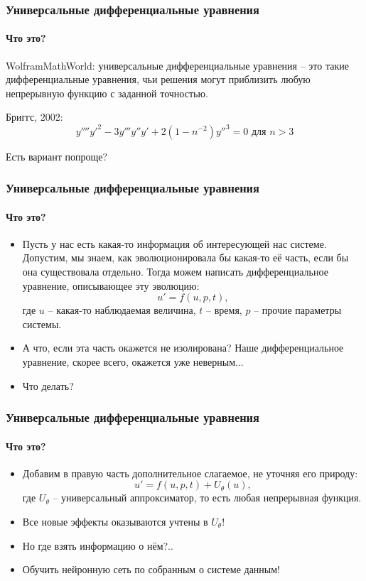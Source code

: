 \documentclass[10pt,pdf,hyperref={unicode}]{beamer}
\begin{document}
		\begin{frame}
			\frametitle{Универсальные дифференциальные уравнения} 
			\framesubtitle{Что это?}
				\begin{center}
				 	WolframMathWorld: универсальные дифференциальные уравнения -- это такие дифференциальные уравнения, чьи решения могут приблизить любую непрерывную функцию с заданной точностью. 
				 	\begin{block}{Бриггс, 2002:}
				 		\begin{displaymath}
				 		y''''y'^2 - 3y'''y''y'+2(1-n^{-2})y''^3=0 \text{ для  } n > 3
				 		\end{displaymath}
				 	\end{block}
			 		\hfill\break
			 		\hfill\break
			 		\hfill\break
				 	 \pause
					Есть вариант попроще?
				 \end{center}
		\end{frame}
	
		\begin{frame}
			\frametitle{Универсальные дифференциальные уравнения} 
			\framesubtitle{Что это?}
			\begin{center}
				\begin{itemize}
					\item<1-> Пусть у нас есть какая-то информация об интересующей нас системе. Допустим, мы знаем, как эволюционировала бы какая-то её часть, если бы она существовала отдельно. Тогда можем написать дифференциальное уравнение, описывающее эту эволюцию:
					\begin{displaymath}
						u' = f(u, p, t),
					\end{displaymath}
					где $u$ -- какая-то наблюдаемая величина, $t$ -- время, $p$ -- прочие параметры системы. 
					\item<2-> А что, если эта часть окажется не изолирована? Наше дифференциальное уравнение, скорее всего, окажется уже неверным... 
					\item<3-> Что делать?
				\end{itemize}
			\end{center}
		\end{frame}
	
		\begin{frame}
			\frametitle{Универсальные дифференциальные уравнения} 
			\framesubtitle{Что это?}
			\begin{center}
				\begin{itemize}
					\item<1-> Добавим в правую часть дополнительное слагаемое, не уточняя его природу:
					\begin{displaymath}
						u' = f(u, p, t) + U_\theta(u),
					\end{displaymath}
					где $U_\theta$ -- универсальный аппроксиматор, то есть любая непрерывная функция.
					\item<2-> Все новые эффекты оказываются учтены в $U_\theta$!
					\item<3-> Но где взять информацию о нём?..
					\item<4-> Обучить нейронную сеть по собранным о системе данным!
				\end{itemize}
			\end{center}
		\end{frame}
	
\end{document}
